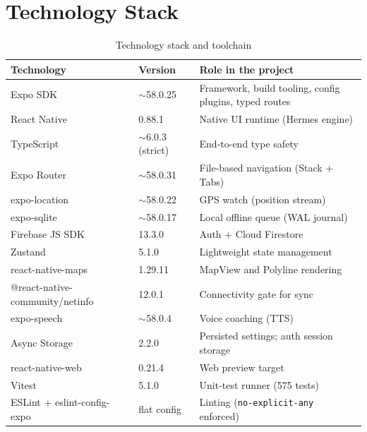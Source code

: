\documentclass[11pt,a4paper]{report}
\begin{document}
\section{Technology Stack}
\begin{table}[htbp]
\centering
\caption{Technology stack and toolchain}
\begin{tabular}{p{4.2cm} p{3.0cm} p{6.4cm}}
\toprule
\textbf{Technology} & \textbf{Version} & \textbf{Role in the project} \\
\midrule
Expo SDK & $\sim$58.0.25 & Framework, build tooling, config plugins, typed routes \\
React Native & 0.88.1 & Native UI runtime (Hermes engine) \\
TypeScript & $\sim$6.0.3 (strict) & End-to-end type safety \\
Expo Router & $\sim$58.0.31 & File-based navigation (Stack + Tabs) \\
expo-location & $\sim$58.0.22 & GPS watch (position stream) \\
expo-sqlite & $\sim$58.0.17 & Local offline queue (WAL journal) \\
Firebase JS SDK & 13.3.0 & Auth + Cloud Firestore \\
Zustand & 5.1.0 & Lightweight state management \\
react-native-maps & 1.29.11 & MapView and Polyline rendering \\
@react-native-community/netinfo & 12.0.1 & Connectivity gate for sync \\
expo-speech & $\sim$58.0.4 & Voice coaching (TTS) \\
Async Storage & 2.2.0 & Persisted settings; auth session storage \\
react-native-web & 0.21.4 & Web preview target \\
Vitest & 5.1.0 & Unit-test runner (575 tests) \\
ESLint + eslint-config-expo & flat config & Linting (\texttt{no-explicit-any} enforced) \\
\bottomrule
\end{tabular}
\end{table}
\end{document}

